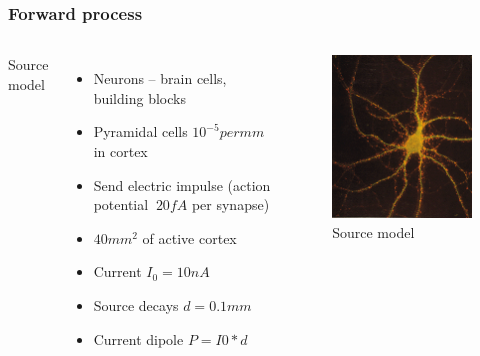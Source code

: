 \documentclass{beamer}
\begin{document}
\begin{frame}
    \frametitle{Forward process}
    \begin{columns}
        Source model
        \begin{itemize}
            \item Neurons – brain cells, building blocks
            \item Pyramidal cells $10^{-5} per mm$ in cortex
            \item Send electric impulse (action potential $~20fA$ per synapse)
            \item $40 mm^{2}$ of active cortex
            \item Current $I_{0} = 10 nA$
            \item Source  decays  $d = 0.1 mm$
            \item Current dipole $P = I0 * d$
        \end{itemize}

        \begin{figure}[H]
            \centering
            \includegraphics[height=0.5\textheight]{source_model.png}
            \caption{Source model}
            \label{fig:Source model}
        \end{figure}

    \end{columns}
\end{frame}
\end{document}

